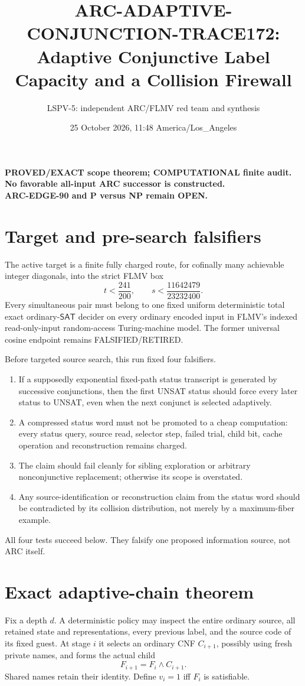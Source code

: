 \documentclass[11pt]{article}
\title{ARC-ADAPTIVE-CONJUNCTION-TRACE172:\\
Adaptive Conjunctive Label Capacity and a Collision Firewall}
\author{LSPV-5: independent ARC/FLMV red team and synthesis}
\date{25 October 2026, 11:48 America/Los\_Angeles}
\newcommand{\SAT}{\mathsf{SAT}}
\begin{document}
\maketitle
\begin{center}
\textbf{PROVED/EXACT scope theorem; COMPUTATIONAL finite audit.}\\
\textbf{No favorable all-input ARC successor is constructed.}\\
\textbf{ARC-EDGE-90 and P versus NP remain OPEN.}
\end{center}

\section{Target and pre-search falsifiers}
The active target is a finite fully charged route, for cofinally many
achievable integer diagonals, into the strict FLMV box
\[
 t<\frac{241}{200},\qquad
 s<\frac{11642479}{23232400}.
\]
Every simultaneous pair must belong to one fixed uniform deterministic total
exact ordinary-\(\SAT\) decider on every ordinary encoded input in FLMV's
indexed read-only-input random-access Turing-machine model.  The former
universal cosine endpoint remains FALSIFIED/RETIRED.

Before targeted source search, this run fixed four falsifiers.
\begin{enumerate}
\item If a supposedly exponential fixed-path status transcript is generated
by successive conjunctions, then the first UNSAT status should force every
later status to UNSAT, even when the next conjunct is selected adaptively.
\item A compressed status word must not be promoted to a cheap computation:
every status query, source read, selector step, failed trial, child bit,
cache operation and reconstruction remains charged.
\item The claim should fail cleanly for sibling exploration or arbitrary
nonconjunctive replacement; otherwise its scope is overstated.
\item Any source-identification or reconstruction claim from the status word
should be contradicted by its collision distribution, not merely by a
maximum-fiber example.
\end{enumerate}
All four tests succeed below.  They falsify one proposed information source,
not ARC itself.

\section{Exact adaptive-chain theorem}
Fix a depth $d$.  A deterministic policy may inspect the entire ordinary
source, all retained state and representations, every previous label, and the
source code of its fixed guest.  At stage $i$ it selects an ordinary CNF
$C_{i+1}$, possibly using fresh private names, and forms the actual child
\[
 F_{i+1}=F_i\wedge C_{i+1}.
\]
Shared names retain their identity.  Define $v_i=1$ iff $F_i$ is satisfiable.
\end{document}
